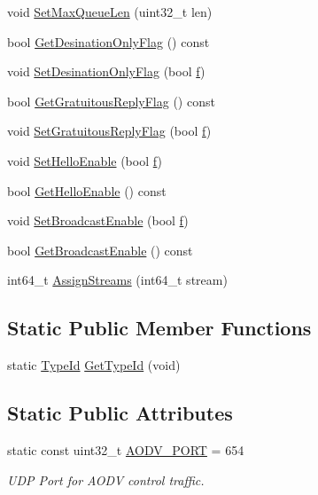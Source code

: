 \begin{DoxyCompactItemize}
\item 
void \hyperlink{classns3_1_1aodv_1_1RoutingProtocol_a852b0099e96031ff62da030f773720ac}{Set\+Max\+Queue\+Len} (uint32\+\_\+t len)
\item 
bool \hyperlink{classns3_1_1aodv_1_1RoutingProtocol_ae0852a1cb6bfda37aef7289a6df42582}{Get\+Desination\+Only\+Flag} () const 
\item 
void \hyperlink{classns3_1_1aodv_1_1RoutingProtocol_accd8a8cfc59ed0990c938ddc630d2349}{Set\+Desination\+Only\+Flag} (bool \hyperlink{80211b_8c_ae7ffc1a8f84fa47a0812b2f2b9627132}{f})
\item 
bool \hyperlink{classns3_1_1aodv_1_1RoutingProtocol_a06777e1e90af0bf8badbc6e8664dda2c}{Get\+Gratuitous\+Reply\+Flag} () const 
\item 
void \hyperlink{classns3_1_1aodv_1_1RoutingProtocol_a87d5d76fac11f8d674cc599d71e6d3aa}{Set\+Gratuitous\+Reply\+Flag} (bool \hyperlink{80211b_8c_ae7ffc1a8f84fa47a0812b2f2b9627132}{f})
\item 
void \hyperlink{classns3_1_1aodv_1_1RoutingProtocol_aace3f902cf89b88cedd6cc64af35c912}{Set\+Hello\+Enable} (bool \hyperlink{80211b_8c_ae7ffc1a8f84fa47a0812b2f2b9627132}{f})
\item 
bool \hyperlink{classns3_1_1aodv_1_1RoutingProtocol_ab1efe83b7bbc5c2b262a71c54000ddba}{Get\+Hello\+Enable} () const 
\item 
void \hyperlink{classns3_1_1aodv_1_1RoutingProtocol_a7b9ff3dbdf0a3cb34965fc271e311eff}{Set\+Broadcast\+Enable} (bool \hyperlink{80211b_8c_ae7ffc1a8f84fa47a0812b2f2b9627132}{f})
\item 
bool \hyperlink{classns3_1_1aodv_1_1RoutingProtocol_aabd68c3a12f1de9f3465e5025cdaa5bc}{Get\+Broadcast\+Enable} () const 
\item 
int64\+\_\+t \hyperlink{classns3_1_1aodv_1_1RoutingProtocol_ac2f2cc4e2b7e6edd4cec0e583e6329bb}{Assign\+Streams} (int64\+\_\+t stream)
\end{DoxyCompactItemize}
\subsection*{Static Public Member Functions}
\begin{DoxyCompactItemize}
\item 
static \hyperlink{classns3_1_1TypeId}{Type\+Id} \hyperlink{classns3_1_1aodv_1_1RoutingProtocol_a430a9cb799a51fc76e8e1580edf5f413}{Get\+Type\+Id} (void)
\end{DoxyCompactItemize}
\subsection*{Static Public Attributes}
\begin{DoxyCompactItemize}
\item 
static const uint32\+\_\+t \hyperlink{classns3_1_1aodv_1_1RoutingProtocol_ac4a3de99b49ad5f6efc9b71a700f7ec4}{A\+O\+D\+V\+\_\+\+P\+O\+RT} = 654
\begin{DoxyCompactList}\small\item\em U\+DP Port for A\+O\+DV control traffic. \end{DoxyCompactList}\end{DoxyCompactItemize}
